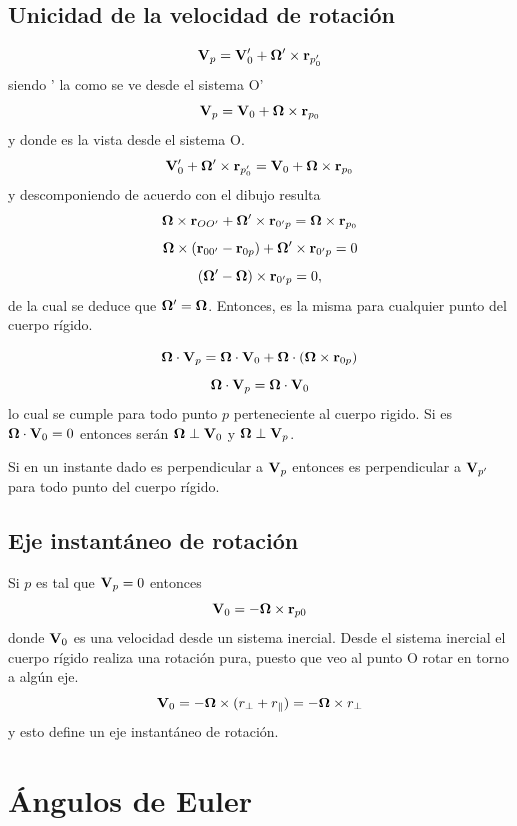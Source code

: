 \documentclass[10pt,oneside]{CBFT_book}
\begin{document}
\subsection{Unicidad de la velocidad de rotación}

\[
	\vb{V}_{p} = \vb{V}_0' + \vb{\Omega}' \times \vb{r}_{p_0'}
\]
siendo \vb{\Omega}' la \vb{\Omega} como se ve desde el sistema O'
\[
	\vb{V}_{p} = \vb{V}_0 + \vb{\Omega} \times \vb{r}_{p_0}
\]
y donde \vb{\Omega} es la vista desde el sistema O.
\[
	\vb{V}_0' + \vb{\Omega}' \times \vb{r}_{p_0'} = \vb{V}_0 + \vb{\Omega} \times \vb{r}_{p_0} 
\]
y descomponiendo de acuerdo con el dibujo resulta 
\[
	\vb{\Omega} \times \vb{r}_{OO'} + \vb{\Omega}' \times \vb{r}_{0'p} = \vb{\Omega} \times \vb{r}_{p_0} 
\]
\[
	\vb{\Omega} \times ( \vb{r}_{00'} - \vb{r}_{0p} ) + \vb{\Omega}' \times \vb{r}_{0'p}  = 0
\]
\[
	( \vb{\Omega}' - \vb{\Omega}  ) \times \vb{r}_{0'p} = 0 ,
\]
de la cual se deduce que $\vb{\Omega}'=\vb{\Omega}$. Entonces, \vb{\Omega} es la misma para cualquier
punto del cuerpo rígido.

\[
	\vb{\Omega} \cdot \vb{V}_p = \vb{\Omega} \cdot \vb{V}_0  + \vb{\Omega}\cdot(\vb{\Omega}\times \vb{r}_{0p} )
\]
\[
	\vb{\Omega} \cdot \vb{V}_p = \vb{\Omega} \cdot \vb{V}_0
\]
lo cual se cumple para todo punto $p$ perteneciente al cuerpo rigido. Si es $\vb{\Omega} \cdot \vb{V}_0 = 0$
entonces serán $\vb{\Omega} \perp \vb{V}_0$ y $\vb{\Omega} \perp \vb{V}_p$.

Si en un instante dado \vb{\Omega} es perpendicular a $\vb{V}_p$ entonces \vb{\Omega} es perpendicular a 
$\vb{V}_{p'}$ para todo punto del cuerpo rígido.

\subsection{Eje instantáneo de rotación}

Si $p$ es tal que $\vb{V}_p = 0$ entonces
\[
	\vb{V}_0 = - \vb{\Omega} \times \vb{r}_{p0}
\]
donde $\vb{V}_0$ es una velocidad desde un sistema inercial.
Desde el sistema inercial el cuerpo rígido realiza una rotación pura, puesto que veo al
punto O rotar en torno a algún eje.
\[
	\vb{V}_0 = - \vb{\Omega} \times ( r_{\perp} + r_{\parallel} ) = -\vb{\Omega} \times  r_{\perp} 
\]
y esto define un eje instantáneo de rotación.

\section{Ángulos de Euler}
\end{document}
